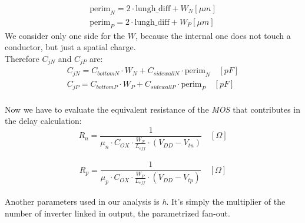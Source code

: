 \documentclass[12pt,  english, makeidx, a4paper, titlepage, oneside]{article}
\begin{document}
\begin{eqnarray}
\text{perim}_N=2 \cdot \text{lungh\_diff} + W_N [\mu m]\\
\text{perim}_P=2 \cdot \text{lungh\_diff} + W_P [\mu m]
\end{eqnarray}
We consider only one side for the $W$, because the internal one does not touch a conductor, but just a spatial charge. \\Therefore $C_{jN}$ and $C_{jP}$ are:
\begin{eqnarray}
C_{jN}=C_{bottomN} \cdot W_N + C_{sidewallN} \cdot \text{perim}_N \quad [pF]\\
C_{jP}=C_{bottomP} \cdot W_P + C_{sidewallP} \cdot \text{perim}_P \quad [pF]
\end{eqnarray}
\\ Now we have to evaluate the equivalent resistance of the \textit{MOS} that contributes in the delay calculation:
\begin{equation}
R_n=\frac{1}{\mu_n \cdot C_{OX} \cdot \frac{W_N}{L_{eff}}\cdot (V_{DD}-V_{tn})} \quad [\Omega]
\end{equation}\\
\begin{equation}
R_p=\frac{1}{\mu_p \cdot C_{OX} \cdot \frac{W_P}{L_{eff}}\cdot (V_{DD}-V_{tp})} \quad [\Omega]
\end{equation}\\
Another parameters used in our analysis is \textit{h}. It's simply the multiplier of the number of inverter linked in output, the parametrized fan-out.
\end{document}
